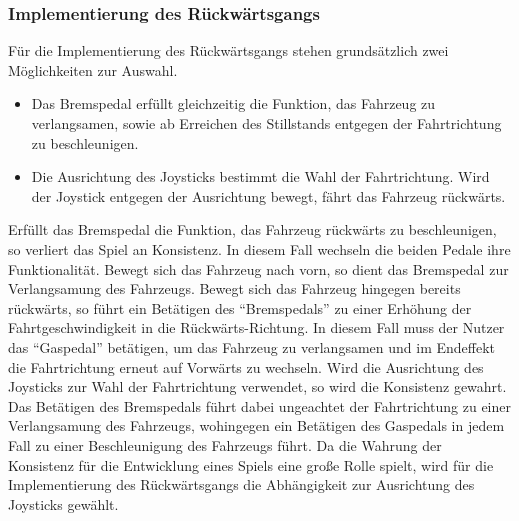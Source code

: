 	\subsubsection{Implementierung des Rückwärtsgangs}
	Für die Implementierung des Rückwärtsgangs stehen grundsätzlich zwei Möglichkeiten zur Auswahl.
	\begin{itemize}
		\item{ Das Bremspedal erfüllt gleichzeitig die Funktion, das Fahrzeug zu verlangsamen, sowie ab Erreichen des Stillstands entgegen der Fahrtrichtung zu beschleunigen.}
		\item{ Die Ausrichtung des Joysticks bestimmt die Wahl der Fahrtrichtung. Wird der Joystick entgegen der Ausrichtung bewegt, fährt das Fahrzeug rückwärts.}
	\end{itemize}
	Erfüllt das Bremspedal die Funktion, das Fahrzeug rückwärts zu beschleunigen, so verliert das Spiel an Konsistenz. In diesem Fall wechseln die beiden Pedale ihre Funktionalität. Bewegt sich das Fahrzeug nach vorn, so dient das Bremspedal zur Verlangsamung des Fahrzeugs. Bewegt sich das Fahrzeug hingegen bereits rückwärts, so führt ein Betätigen des \enquote{Bremspedals} zu einer Erhöhung der Fahrtgeschwindigkeit in die Rückwärts-Richtung. In diesem Fall muss der Nutzer das \enquote{Gaspedal} betätigen, um das Fahrzeug zu verlangsamen und im Endeffekt die Fahrtrichtung erneut auf Vorwärts zu wechseln.
	Wird die Ausrichtung des Joysticks zur Wahl der Fahrtrichtung verwendet, so wird die Konsistenz gewahrt. Das Betätigen des Bremspedals führt dabei ungeachtet der Fahrtrichtung zu einer Verlangsamung des Fahrzeugs, wohingegen ein Betätigen des Gaspedals in jedem Fall zu einer Beschleunigung des Fahrzeugs führt. Da die Wahrung der Konsistenz für die Entwicklung eines Spiels eine große Rolle spielt, wird für die Implementierung des Rückwärtsgangs die Abhängigkeit zur Ausrichtung des Joysticks gewählt.

